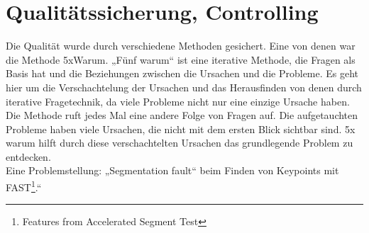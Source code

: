 \section{Qualitätssicherung, Controlling}
Die Qualität wurde durch verschiedene Methoden gesichert. Eine von denen war die Methode 5xWarum. 
\justify 
„Fünf warum“ ist eine iterative Methode, die Fragen als Basis hat und die Beziehungen zwischen die Ursachen und die Probleme. Es geht hier um die Verschachtelung der Ursachen und das Herausfinden von denen durch iterative Fragetechnik, da viele Probleme nicht nur eine einzige Ursache haben. Die Methode ruft jedes Mal eine andere Folge von Fragen auf.\cite{fmea}
\justify
Die aufgetauchten Probleme haben viele Ursachen, die nicht mit dem ersten Blick sichtbar sind. 5x warum hilft durch diese verschachtelten Ursachen das grundlegende Problem zu entdecken. \\

Eine Problemstellung: „Segmentation fault“ beim Finden von Keypoints mit FAST\footnote{Features from Accelerated Segment Test}.“ 


